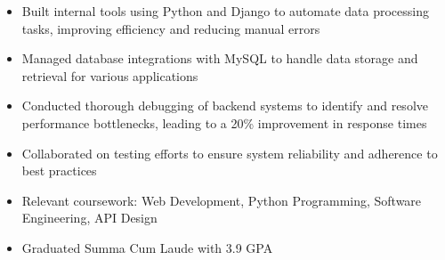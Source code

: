 \par\smallskip
\begin{minipage}{13.75cm}
  \begin{minipage}{6.5cm}
    \begin{itemize}
      \item Built internal tools using Python and Django to automate data processing tasks, improving efficiency and reducing manual errors
      \item Managed database integrations with MySQL to handle data storage and retrieval for various applications
    \end{itemize}
  \end{minipage}
  \hfill
  \begin{minipage}{6.5cm}
    \begin{itemize}
      \item Conducted thorough debugging of backend systems to identify and resolve performance bottlenecks, leading to a 20\% improvement in response times
      \item Collaborated on testing efforts to ensure system reliability and adherence to best practices
    \end{itemize}
  \end{minipage}
\end{minipage}

\par\bigskip
{}
\begin{itemize}
  \item Relevant coursework: Web Development, Python Programming, Software Engineering, API Design
\end{itemize}
\divider

\begin{itemize}
  \item Graduated Summa Cum Laude with 3.9 GPA
\end{itemize}


